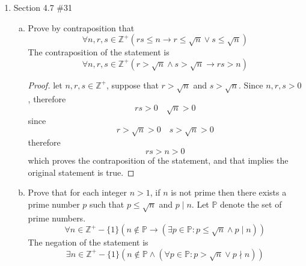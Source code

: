 \documentclass[12pt]{article}
\newcommand{\Z}{\mathbb{Z}}
\newcommand{\paren}[1]{\left( #1 \right)}
\newcommand{\then}{\rightarrow}
\begin{document}
\begin{enumerate}
\begin{proof}[Proof 4.7.28-II]
            Combining these cases, we have shown that if \( a \mid (b+c) \), then either \( a \nmid b \) or \( a \mid c \).
            
            Therefore, we have proved the contrapositive, which implies the original statement:
            \[
            \forall a,b,c \in \mathbb{Z} \left( a \mid b \wedge a \nmid c \rightarrow a \nmid (b+c) \right).
            \]
            \end{proof}

        \newpage

    \item Section 4.7 \#31
        \begin{enumerate}[a.]
            \item Prove by contraposition that
                \[
                \forall n,r,s \in \Z^+ \paren{rs \leq n \then r \leq \sqrt{n} \vee s \leq \sqrt{n}}
                \]
                The contraposition of the statement is
                \[
                \forall n,r,s \in \Z^+ \paren{ r > \sqrt{n} \wedge s > \sqrt{n} \then rs > n}
                \]
                    \begin{proof}
                        let $n,r,s \in \Z^+$, suppose that $r > \sqrt{n}$ and $ s > \sqrt{n}$. Since $n,r,s >0$, therefore 
                        \[
                        rs > 0 \quad \sqrt{n}>0
                        \]
                        since
                        \[
                        r>\sqrt{n}>0 \quad s > \sqrt{n} >0
                        \]
                        therefore
                        \[
                        rs > n > 0
                        \]
                        which proves the contraposition of the statement, and that implies the original statement is true.
                    \end{proof}
            \item Prove that for each integer \( n > 1 \), if \( n \) is not prime then there exists a prime number \( p \) such that \( p \leq \sqrt{n} \) and \( p \mid n \).
            Let \( \mathbb{P} \) denote the set of prime numbers.
            \[
            \forall n \in \mathbb{Z}^+ - \{1\} \left( n \notin \mathbb{P} \rightarrow \left( \exists p \in \mathbb{P} : p \leq \sqrt{n} \wedge p \mid n \right) \right)
            \]
            The negation of the statement is
            \[
            \exists n \in \mathbb{Z}^+ - \{1\} \left( n \notin \mathbb{P} \wedge \left( \forall p \in \mathbb{P} : p > \sqrt{n} \vee p \nmid n \right) \right)
            \]
            

\end{enumerate}
\end{enumerate}
\end{document}
